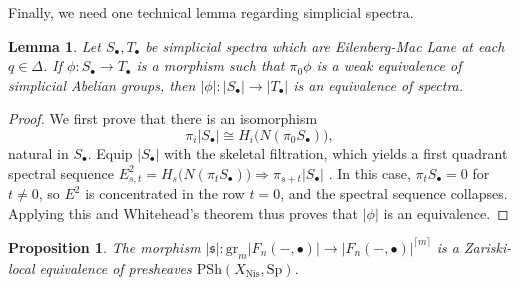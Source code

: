 \documentclass[11pt, twoside]{article}
\numberwithin{equation}{section}
\newtheorem{lemma}[equation]{Lemma}
\newtheorem{proposition}[equation]{Proposition}
\theoremstyle{definition}
\newcommand{\mf}[1]{\mathfrak{#1}}
\newcommand{\gr}{\mathrm{gr}}
\newcommand{\Sp}{\mathrm{Sp}}
\newcommand{\psh}{\mathrm{PSh}}
\newcommand{\nis}{\mathrm{Nis}}
\begin{document}
Finally, we need one technical lemma regarding simplicial spectra.

\begin{lemma}\label{lemm:dsc-sim-sp} Let \(S_\bullet, T_\bullet\) be simplicial spectra which are Eilenberg-Mac Lane at each \(q \in \Delta\). If \(\phi \colon S_\bullet \to T_\bullet\) is a morphism such that \(\pi_0\phi\) is a weak equivalence of simplicial Abelian groups, then \(|\phi| \colon |S_\bullet| \to |T_\bullet|\) is an equivalence of spectra.
\end{lemma}

\begin{proof}
We first prove that there is an isomorphism 
\[\pi_i|S_\bullet| \cong H_i\big(N(\pi_0 S_\bullet)\big),\]
natural in \(S_\bullet\). Equip \(|S_\bullet|\) with the skeletal filtration, which yields a first quadrant spectral sequence \(E_{s, t}^2 = H_s\big(N(\pi_t S_\bullet)\big) \Longrightarrow \pi_{s + t} |S_\bullet|\) \cite[Remark 1.2.4.4]{HA}.  In this case, \(\pi_t S_\bullet = 0\) for \(t \neq 0\), so \(E^2\) is concentrated in the row \(t = 0\), and the spectral sequence collapses. Applying this and Whitehead's theorem thus proves that \(|\phi|\) is an equivalence.
\end{proof}

\begin{proposition}
The morphism \(|\mf{s}| \colon \gr_m |F_n( -, \bullet)| \to |F_n( -, \bullet)|^{\lceil m \rceil}\) is a Zariski-local equivalence of presheaves \(\psh(X_\nis, \Sp)\).
\end{proposition}
\end{document}
